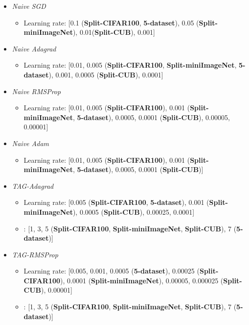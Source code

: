 \documentclass{article} \usepackage{collas2022_conference,times}
\begin{document}
\begin{itemize}
    \item \textit{Naive SGD}
    \begin{itemize}
        \item Learning rate: [0.1 (\textbf{Split-CIFAR100}, \textbf{5-dataset}), 0.05 (\textbf{Split-miniImageNet}), 0.01(\textbf{Split-CUB}), 0.001]
    \end{itemize}
    \item \textit{Naive Adagrad}
    \begin{itemize}
        \item Learning rate: [0.01, 0.005 (\textbf{Split-CIFAR100}, \textbf{Split-miniImageNet}, \textbf{5-dataset}), 0.001, 0.0005 (\textbf{Split-CUB}), 0.0001]
    \end{itemize}
    \item \textit{Naive RMSProp}
    \begin{itemize}
        \item Learning rate: [0.01, 0.005 (\textbf{Split-CIFAR100}), 0.001 (\textbf{Split-miniImageNet}, \textbf{5-dataset}), 0.0005, 0.0001 (\textbf{Split-CUB}), 0.00005, 0.00001]
    \end{itemize}
    \item \textit{Naive Adam}
    \begin{itemize}
        \item Learning rate: [0.01, 0.005 (\textbf{Split-CIFAR100}), 0.001 (\textbf{Split-miniImageNet}, \textbf{5-dataset}), 0.0005, 0.0001 (\textbf{Split-CUB})]
    \end{itemize}
    \item \textit{TAG-Adagrad}
    \begin{itemize}
        \item Learning rate: [0.005 (\textbf{Split-CIFAR100}, \textbf{5-dataset}), 0.001 (\textbf{Split-miniImageNet}), 0.0005  (\textbf{Split-CUB}), 0.00025, 0.0001]
        \item : [1, 3, 5 (\textbf{Split-CIFAR100}, \textbf{Split-miniImageNet}, \textbf{Split-CUB}), 7 (\textbf{5-dataset})] 
    \end{itemize}
    \item \textit{TAG-RMSProp}
    \begin{itemize}
        \item Learning rate: [0.005, 0.001, 0.0005 (\textbf{5-dataset}), 0.00025 (\textbf{Split-CIFAR100}), 0.0001 (\textbf{Split-miniImageNet}), 0.00005, 0.000025 (\textbf{Split-CUB}), 0.00001]
        \item : [1, 3, 5 (\textbf{Split-CIFAR100}, \textbf{Split-miniImageNet}, \textbf{Split-CUB}), 7 (\textbf{5-dataset})] 

\end{itemize}
\end{itemize}
\end{document}
